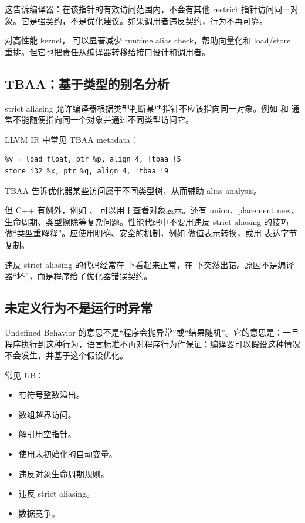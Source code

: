 这告诉编译器：在该指针的有效访问范围内，不会有其他 restrict 指针访问同一对象。它是强契约，不是优化建议。如果调用者违反契约，行为不再可靠。

对高性能 kernel， 可以显著减少 runtime alias check，帮助向量化和 load/store 重排。但它也把责任从编译器转移给接口设计和调用者。

\subsection{TBAA：基于类型的别名分析}

strict aliasing 允许编译器根据类型判断某些指针不应该指向同一对象。例如  和  通常不能随便指向同一个对象并通过不同类型访问它。

LLVM IR 中常见 TBAA metadata：

\begin{lstlisting}
%v = load float, ptr %p, align 4, !tbaa !5
store i32 %x, ptr %q, align 4, !tbaa !9
\end{lstlisting}

TBAA 告诉优化器某些访问属于不同类型树，从而辅助 alias analysis。

但 C++ 有例外，例如 、 可以用于查看对象表示。还有 union、placement new、生命周期、类型擦除等复杂问题。性能代码中不要用违反 strict aliasing 的技巧做“类型重解释”。应使用明确、安全的机制，例如  做值表示转换，或用  表达字节复制。

\begin{warningbox}
违反 strict aliasing 的代码经常在  下看起来正常，在  下突然出错。原因不是编译器“坏”，而是程序给了优化器错误契约。
\end{warningbox}

\subsection{未定义行为不是运行时异常}

Undefined Behavior 的意思不是“程序会抛异常”或“结果随机”。它的意思是：一旦程序执行到这种行为，语言标准不再对程序行为作保证；编译器可以假设这种情况不会发生，并基于这个假设优化。

常见 UB：

\begin{itemize}
  \item 有符号整数溢出。
  \item 数组越界访问。
  \item 解引用空指针。
  \item 使用未初始化的自动变量。
  \item 违反对象生命周期规则。
  \item 违反 strict aliasing。
  \item 数据竞争。
\end{itemize}

